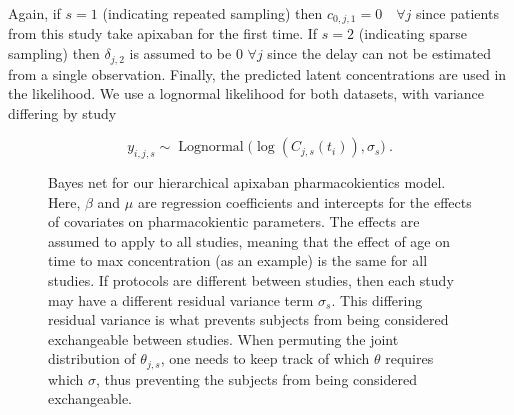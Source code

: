Again, if $s=1$ (indicating repeated sampling) then $c_{0, j, 1} = 0 \quad \forall j$ since patients from this study take apixaban for the first time.  If $s=2$ (indicating sparse sampling) then $\delta_{j, 2}$ is assumed to be 0 $\forall j$ since the delay can not be estimated from a single observation.  Finally, the predicted latent concentrations are used in the likelihood.  We use a lognormal likelihood for both datasets, with variance differing by study

$$ y_{i,j,s} \sim \operatorname{Lognormal}\Big( \log(C_{j, s}(t_i)), \sigma_s \Big)  \>.$$


\begin{figure}[t!]
	
	\centering
	\caption{Bayes net for our hierarchical apixaban pharmacokientics model.  Here, $\beta$ and $\mu$ are regression coefficients and intercepts for the effects of covariates on pharmacokientic parameters.  The effects are assumed to apply to all studies, meaning that the effect of age on time to max concentration (as an example) is the same for all studies.  If protocols are different between studies, then each study may have a different residual variance term $\sigma_s$.  This differing residual variance is what prevents subjects from being considered exchangeable between studies.  When permuting the joint distribution of $\theta_{j, s}$, one needs to keep track of which $\theta$ requires which $\sigma$, thus preventing the subjects from being considered exchangeable.}
\end{figure}

